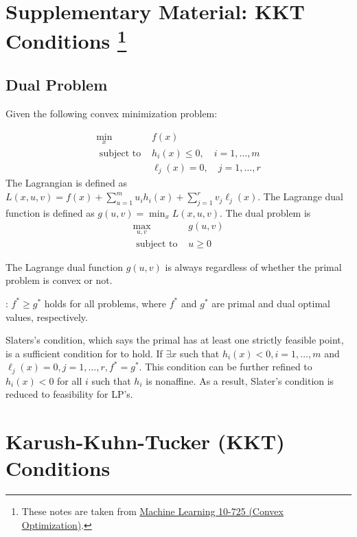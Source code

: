 \section[Supplementary Material: KKT Conditions ]{Supplementary Material: KKT Conditions \footnote{These notes are taken from \href{https://www.stat.cmu.edu/~ryantibs/convexopt/}{Machine Learning 10-725 (Convex Optimization)}.}}


\subsection{Dual Problem}

Given the following convex minimization problem:

\begin{problem}
    \label{pro:kkt-problem}
    $$
\begin{array}{ll}
\min _{x} & f(x) \\
\text { subject to } & h_{i}(x) \leq 0, \quad i=1, \ldots, m \\
& \ell_{j}(x)=0, \quad j=1, \ldots, r
\end{array}
$$
The Lagrangian is defined as $ L(x, u, v)=f(x)+\sum_{u=1}^{m} u_{i} h_{i}(x)+\sum_{j=1}^{r} v_{j} \ell_{j}(x) . $ The Lagrange dual function is defined as $ g(u, v)=\min _{x} L(x, u, v) $. The dual problem is
$$
\begin{array}{ll}
\max _{u, v} & g(u, v) \\
\text { subject to } & u \geq 0
\end{array}
$$
\end{problem}


The Lagrange dual function $ g(u, v) $ is always  regardless of whether the primal problem is convex or not.

: $ f^{*} \geq g^{*} $ holds for all problems, where $ f^{*} $ and $ g^{*} $ are primal and dual optimal values, respectively.

Slaters's condition, which says the primal has at least one strictly feasible point, is a sufficient condition for  to hold. If $ \exists x $ such that $ h_{i}(x)<0, i=1, \ldots, m $ and $ \ell_{j}(x)=0, j=1, \ldots, r, f^{*}=g^{*} $. This condition can be further refined to $ h_{i}(x)<0 $ for all $ i $ such that $ h_{i} $ is nonaffine. As a result, Slater's condition is reduced to feasibility for LP's.

\section{Karush-Kuhn-Tucker (KKT) Conditions}

